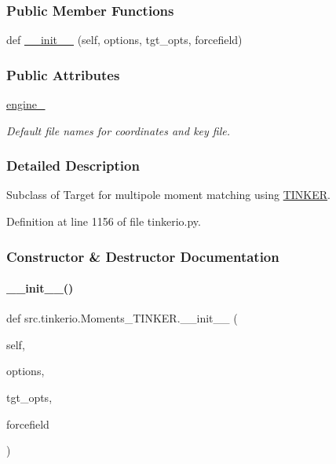 \subsubsection*{Public Member Functions}
\begin{DoxyCompactItemize}
\item 
def \hyperlink{classsrc_1_1tinkerio_1_1Moments__TINKER_af89fa02fb9a6ce5f975f17128e86b89d}{\+\_\+\+\_\+init\+\_\+\+\_\+} (self, options, tgt\+\_\+opts, forcefield)
\end{DoxyCompactItemize}
\subsubsection*{Public Attributes}
\begin{DoxyCompactItemize}
\item 
\hyperlink{classsrc_1_1tinkerio_1_1Moments__TINKER_aae027fa6152ecc3939a3a47336a24ec1}{engine\+\_\+}
\begin{DoxyCompactList}\small\item\em Default file names for coordinates and key file. \end{DoxyCompactList}\end{DoxyCompactItemize}


\subsubsection{Detailed Description}
Subclass of Target for multipole moment matching using \hyperlink{classsrc_1_1tinkerio_1_1TINKER}{T\+I\+N\+K\+ER}. 



Definition at line 1156 of file tinkerio.\+py.



\subsubsection{Constructor \& Destructor Documentation}
\mbox{\label{classsrc_1_1tinkerio_1_1Moments__TINKER_af89fa02fb9a6ce5f975f17128e86b89d}} 
\paragraph{\texorpdfstring{\+\_\+\+\_\+init\+\_\+\+\_\+()}{\_\_init\_\_()}}
{\footnotesize\ttfamily def src.\+tinkerio.\+Moments\+\_\+\+T\+I\+N\+K\+E\+R.\+\_\+\+\_\+init\+\_\+\+\_\+ (\begin{DoxyParamCaption}\item[{}]{self,  }\item[{}]{options,  }\item[{}]{tgt\+\_\+opts,  }\item[{}]{forcefield }\end{DoxyParamCaption})}



